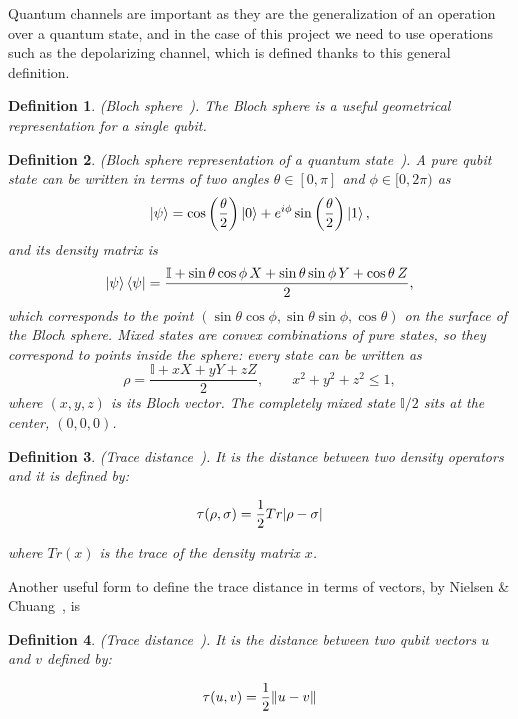 \documentclass{ieeeaccess}
\newtheorem{definition}{Definition}[section]
\begin{document}
Quantum channels are important as they are the generalization of an operation over a quantum state, and in the case of this project we need to use operations such as the depolarizing channel, which is defined thanks to this general definition.

\begin{definition}
    (Bloch sphere~\cite{watrous_quantum_channels}). The Bloch sphere is a useful geometrical representation for a single qubit. 
    \label{def:bloch_sphere}
\end{definition}

\begin{definition}
  (Bloch sphere representation of a quantum state~\cite{watrous_bloch_sphere}). A pure qubit state can be written in terms of two angles $\theta \in [0, \pi]$ and $\phi \in [0, 2\pi)$ as
  \[
    \ket{\psi} = \cos\left(\frac{\theta}{2}\right)\ket{0} + e^{i\phi}\sin\left(\frac{\theta}{2}\right)\ket{1},
  \]
  and its density matrix is
  \[
    \ket{\psi}\bra{\psi} = \frac{\mathbb{I} + \sin\theta\cos\phi\, X + \sin\theta\sin\phi\, Y + \cos\theta\, Z}{2},
  \]
  which corresponds to the point $(\sin\theta\cos\phi, \sin\theta\sin\phi, \cos\theta)$ on the surface of the Bloch sphere. Mixed states are convex combinations of pure states, so they correspond to points inside the sphere: every state can be written as
  \[
    \rho = \frac{\mathbb{I} + xX + yY + zZ}{2}, \qquad x^2 + y^2 + z^2 \leq 1,
  \]
  where $(x, y, z)$ is its Bloch vector. The completely mixed state $\mathbb{I}/2$ sits at the center, $(0, 0, 0)$.
  \label{def:bloch_representation}
\end{definition}



\begin{definition}
    (Trace distance~\cite{zhou2017differential}). It is the distance between two density operators and it is defined by:

    \[
      \tau(\rho, \sigma) = \frac{1}{2}Tr\abs{\rho - \sigma}
    \]

    where $Tr(x)$ is the trace of the density matrix $x$.
    \label{def:trace_distance}
\end{definition}

Another useful form to define the trace distance in terms of vectors, by Nielsen \& Chuang~\cite{Nielsen_Chuang_2010}, is 

\begin{definition}
    (Trace distance~\cite{Nielsen_Chuang_2010}). It is the distance between two qubit vectors $u$ and $v$ defined by:

    \[
      \tau(u, v) = \frac{1}{2}\norm{u - v}
    \]
    \label{def:trace_distance_vector}
\end{definition}
\end{document}
